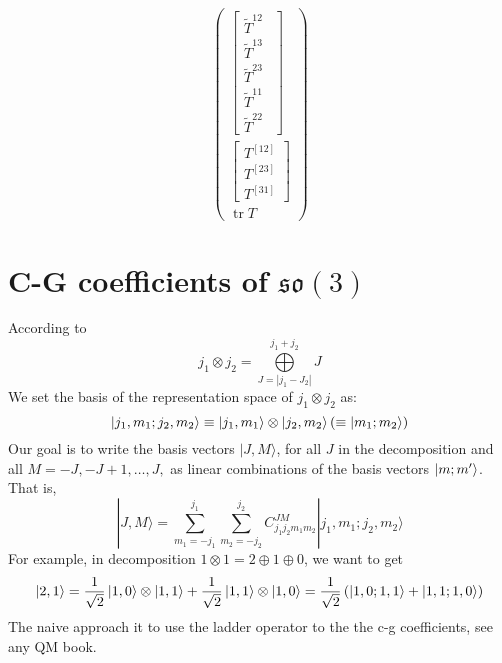 \documentclass{article}
\begin{document}
\begin{equation*}
\begin{pmatrix}
\begin{bmatrix}
				\tilde{T}^{12}\\
				\tilde{T}^{13}\\
				\tilde{T}^{23}\\
				\tilde{T}^{11}\\
				\tilde{T}^{22} \ \ 
			\end{bmatrix}\\
			\begin{bmatrix}
				T^{[ 12]}\\
				T^{[ 23]}\\
				T^{[ 31]}
			\end{bmatrix}\\
			\operatorname{tr} T
		\end{pmatrix}
	\end{equation*}
	$ $ 
	\section{C-G coefficients of $\mathfrak{so}( 3)$}
	
	According to
	\begin{equation*}
		j_{1} \otimes j_{2} =\underset{J=| j_{1} -J_{2}| }{\overset{j_{1} +j_{2}}{\bigoplus }} J
	\end{equation*}
	We set the basis of the representation space of $j_{1} \otimes j_{2}$ as:
	\begin{equation*}
		\ket{j_{1} ,m_{1} ;j_{2} ,m_{2}} \equiv \ket{j_{1} ,m_{1}} \otimes \ket{j_{2} ,m_{2}}\left( \equiv \ket{m_{1} ;m_{2}}\right)
	\end{equation*}
	Our goal is to write the basis vectors $|J,M\rangle  $, for all $J$ in the decomposition and all $M=-J,-J+1,\dotsc ,J,$ as linear combinations of the basis vectors $\ket{m;m'}$. That is,
	\begin{equation}
		|J,M\rangle  =\sum _{m_{1} =-j_{1}}^{j_{1}}\sum _{m_{2} =-j_{2}}^{j_{2}} C_{j_{1} j_{2} m_{1} m_{2}}^{JM}| j_{1} ,m_{1} ;j_{2} ,m_{2}\rangle 
	\end{equation}
	For example, in decomposition $1\otimes 1=2\oplus 1\oplus 0$, we want to get
	\begin{equation*}
		\ket{2,1} =\frac{1}{\sqrt{2}}\ket{1,0} \otimes \ket{1,1} +\frac{1}{\sqrt{2}}\ket{1,1} \otimes \ket{1,0} =\frac{1}{\sqrt{2}}\left(\ket{1,0;1,1} +\ket{1,1;1,0}\right)
	\end{equation*}
	The naive approach it to use the ladder operator to the the c-g coefficients, see any QM book. 
	
\end{document}
